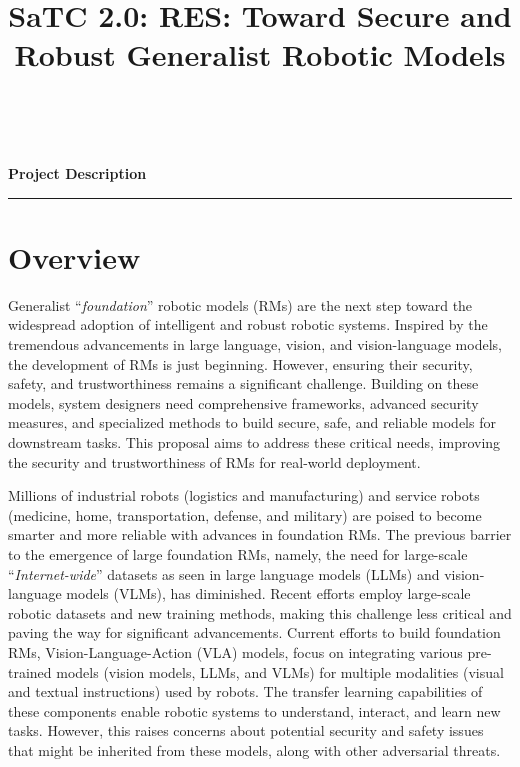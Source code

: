 \documentclass[11pt,letterpaper]{article}
\begin{document}
\pagestyle{empty} 


\setlength{\baselineskip}{12.6pt} %
\setlength{\normalbaselineskip}{12.6pt} %
\title{\Large
SaTC 2.0: RES: Toward Secure and Robust Generalist Robotic  Models} 
\begin{center}
   {\bfseries\filcenter} ~\vspace{2ex}
   {\Large\bfseries\filcenter
Project Description
\\\rule{\textwidth}{0.4pt}}
\end{center}


\section{Overview}

Generalist ``\emph{foundation}'' robotic models (RMs) are the next step toward the widespread adoption of intelligent and robust robotic systems. 
Inspired by the tremendous advancements in large language, vision, and vision-language models, the development of RMs is just beginning. 
However, ensuring their security, safety, and trustworthiness remains a significant challenge. Building on these models, system designers need comprehensive frameworks, advanced security measures, and specialized methods to build secure, safe, and reliable models for downstream tasks. This proposal aims to address these critical needs, improving the security and trustworthiness of RMs for real-world deployment. 

Millions of industrial robots (\eg logistics and manufacturing) and service robots (\eg medicine, home, transportation, defense, and military) are poised to become smarter and more reliable with advances in foundation RMs. The previous barrier to the emergence of large foundation RMs, namely, the need for large-scale ``\emph{Internet-wide}'' datasets as seen in large language models (LLMs) and vision-language models (VLMs), has diminished. Recent efforts employ large-scale \xot robotic datasets and new training methods, making this challenge less critical and paving the way for significant advancements.
Current efforts to build foundation RMs, \eg Vision-Language-Action (VLA) models, focus on integrating various pre-trained models (\eg vision models, LLMs, and VLMs) for multiple modalities (\eg visual and textual instructions) used by robots. 
The transfer learning capabilities of these components enable robotic systems to understand, interact, and learn new tasks. However, this raises concerns about potential security and safety issues that might be inherited from these models, along with other adversarial threats.%
\end{document}
